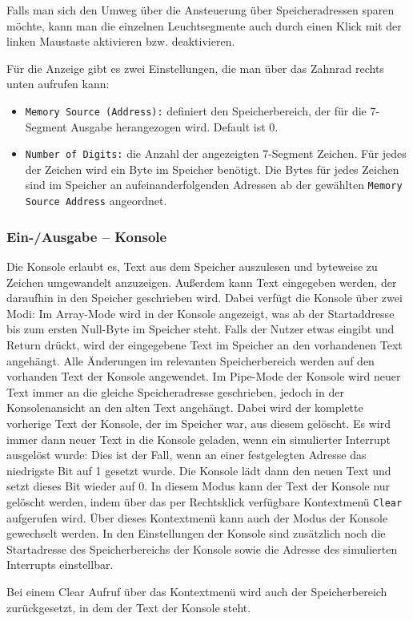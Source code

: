 Falls man sich den Umweg über die Ansteuerung über Speicheradressen sparen möchte,
kann man die einzelnen Leuchtsegmente auch durch einen Klick mit der linken Maustaste aktivieren bzw. deaktivieren.

Für die Anzeige gibt es zwei Einstellungen, die man über das Zahnrad rechts unten aufrufen kann:\\
\begin{itemize}
\item \texttt{Memory Source (Address):} definiert den Speicherbereich, der für die 7-Segment Ausgabe herangezogen wird. Default ist 0.
\item \texttt{Number of Digits:} die Anzahl der angezeigten 7-Segment Zeichen. Für jedes der Zeichen wird ein Byte im Speicher benötigt.
					Die Bytes für jedes Zeichen sind im Speicher an aufeinanderfolgenden Adressen ab der gewählten  \texttt{Memory Source Address} angeordnet.
\end{itemize}



\subsubsection{Ein-/Ausgabe -- Konsole}

Die Konsole erlaubt es, Text aus dem Speicher auszulesen und byteweise zu
Zeichen umgewandelt anzuzeigen. Außerdem kann Text eingegeben werden, der
daraufhin in den Speicher geschrieben wird. Dabei verfügt die Konsole über zwei
Modi: Im Array-Mode wird in der Konsole angezeigt, was ab der Startaddresse bis
zum ersten Null-Byte im Speicher steht. Falls der Nutzer etwas eingibt und
Return drückt, wird der eingegebene Text im Speicher an den vorhandenen Text
angehängt. Alle Änderungen im relevanten Speicherbereich werden auf den
vorhanden Text der Konsole angewendet. Im Pipe-Mode der Konsole wird neuer Text
immer an die gleiche Speicheradresse geschrieben, jedoch in der Konsolenansicht
an den alten Text angehängt. Dabei wird der komplette vorherige Text der
Konsole, der im Speicher war, aus diesem gelöscht. Es wird immer dann neuer Text
in die Konsole geladen, wenn ein simulierter Interrupt ausgelöst wurde: Dies ist
der Fall, wenn an einer festgelegten Adresse das niedrigste Bit auf 1 gesetzt
wurde. Die Konsole lädt dann den neuen Text und setzt dieses Bit wieder auf 0.
In diesem Modus kann der Text der Konsole nur gelöscht werden, indem über das
per Rechtsklick verfügbare Kontextmenü \texttt{Clear} aufgerufen wird. Über
dieses Kontextmenü kann auch der Modus der Konsole gewechselt werden. In den
Einstellungen der Konsole sind zusätzlich noch die Startadresse des
Speicherbereichs der Konsole sowie die Adresse des simulierten Interrupts
einstellbar.
\begin{warningblock}
Bei einem Clear Aufruf über das Kontextmenü wird auch der Speicherbereich
zurückgesetzt, in dem der Text der Konsole steht.
\end{warningblock}


